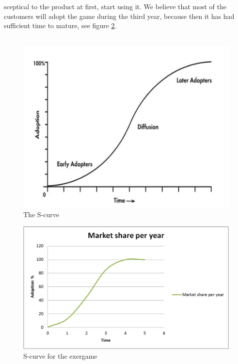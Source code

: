 sceptical to the product at first, start using it. We believe that most of the customers will adopt the game during the third year, because then it has had sufficient time to mature, see figure \ref{fig:scurve2}. \\ \\ 
\begin{figure}
\begin{center}
\includegraphics[scale=0.4]{scurve}
\caption[The S-curve]{The S-curve \cite{scurve}}
\label{fig:scurve}
\end{center}
\end{figure}
\begin{figure}
\begin{center}
\includegraphics[scale=0.5]{scurve2}
\caption[The S-curve]{S-curve for the exergame}
\label{fig:scurve2}
\end{center}
\end{figure}
